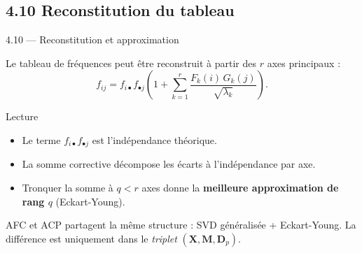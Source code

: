 \subsection{4.10 Reconstitution du tableau}
\begin{frame}{4.10 — Reconstitution et approximation}
\begin{theorem}
Le tableau de fréquences peut être reconstruit à partir des $r$ axes
principaux :
\[
f_{ij} = f_{i\bullet} f_{\bullet j}
        \left(1 + \sum_{k=1}^r \frac{F_k(i)\, G_k(j)}{\sqrt{\lambda_k}}\right).
\]
\end{theorem}

\begin{block}{Lecture}
\begin{itemize}\small
  \item Le terme $f_{i\bullet} f_{\bullet j}$ est l'\alert{indépendance théorique}.
  \item La somme corrective décompose les écarts à l'indépendance par axe.
  \item Tronquer la somme à $q < r$ axes donne la \textbf{meilleure
        approximation de rang $q$} (Eckart-Young).
\end{itemize}
\end{block}

\begin{rema}
\small AFC et ACP partagent la même structure : SVD généralisée + Eckart-Young.
La différence est uniquement dans le \emph{triplet} $(\mathbf{X}, \mathbf{M}, \mathbf{D}_p)$.
\end{rema}
\end{frame}

